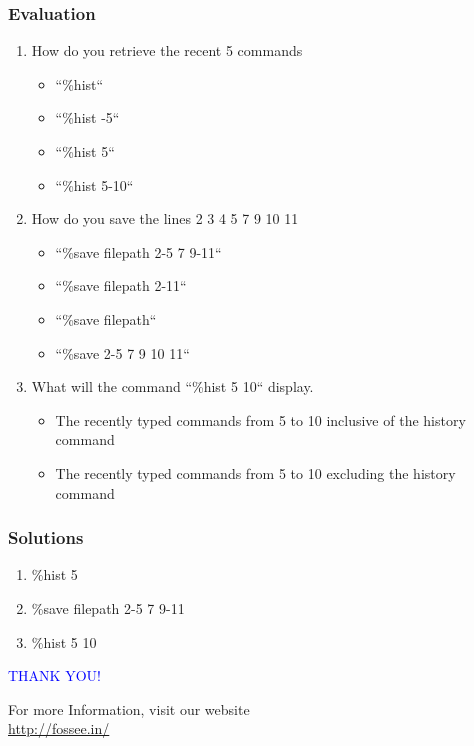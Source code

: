 \documentclass[presentation]{beamer}
\begin{document}
\begin{frame}
\frametitle{Evaluation}
\label{sec-10}


\begin{enumerate}
\item How do you retrieve the recent 5 commands
\begin{itemize}
\item ``\%hist``
\item ``\%hist -5``
\item ``\%hist 5``
\item ``\%hist 5-10``
\end{itemize}
\item How do you save the lines 2 3 4 5 7 9 10 11
\begin{itemize}
\item ``\%save filepath 2-5 7 9-11``
\item ``\%save filepath 2-11``
\item ``\%save filepath``
\item ``\%save 2-5 7 9 10 11``
\end{itemize}
\item What will the command ``\%hist 5 10`` display.
\begin{itemize}
\item The recently typed commands from 5 to 10 inclusive of 
      the history command
\item The recently typed commands from 5 to 10 excluding 
      the history command
\end{itemize}
\end{enumerate}
\end{frame}
\begin{frame}
\frametitle{Solutions}
\label{sec-11}


\begin{enumerate}
\item \%hist 5
\item \%save filepath 2-5 7 9-11
\item \%hist 5 10
\end{enumerate}
\end{frame}
\begin{frame}

  \begin{block}{}
  \begin{center}
  \textcolor{blue}{\Large THANK YOU!} 
  \end{center}
  \end{block}
\begin{block}{}
  \begin{center}
    For more Information, visit our website\\
    \url{http://fossee.in/}
  \end{center}  
  \end{block}
\end{frame}
\end{document}
